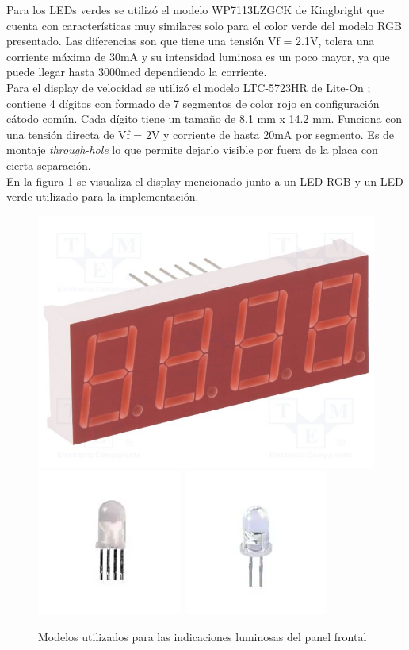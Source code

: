 Para los LEDs verdes se utilizó el modelo WP7113LZGCK de Kingbright \cite{WP7113LZGCK} que cuenta con características muy similares solo para el color verde del modelo RGB presentado. Las diferencias son que tiene una tensión Vf = 2.1V, tolera una corriente máxima de 30mA y su intensidad luminosa es un poco mayor, ya que puede llegar hasta 3000mcd dependiendo la corriente. \\ 

Para el display de velocidad se utilizó el modelo LTC-5723HR de Lite-On \cite{LTC-5723HR}; contiene 4 dígitos con formado de 7 segmentos de color rojo en configuración cátodo común. Cada dígito tiene un tamaño de 8.1 mm x 14.2 mm. Funciona con una tensión directa de Vf = 2V y corriente de hasta 20mA por segmento. Es de montaje \textit{through-hole} lo que permite dejarlo visible por fuera de la placa con cierta separación. \\

En la figura \ref{fig:leds_model} se visualiza el display mencionado junto a un LED RGB y un LED verde utilizado para la implementación. 

\begin{figure}[H]
    \centering
    \includegraphics[width = 0.3 \linewidth]{img/display.jpg}
    \includegraphics[width = 0.3 \linewidth]{img/led_rgb.png}
    \includegraphics[width = 0.3 \linewidth]{img/led_g.png}
    \caption{Modelos utilizados para las indicaciones luminosas del panel frontal}
    \label{fig:leds_model}
\end{figure}    


